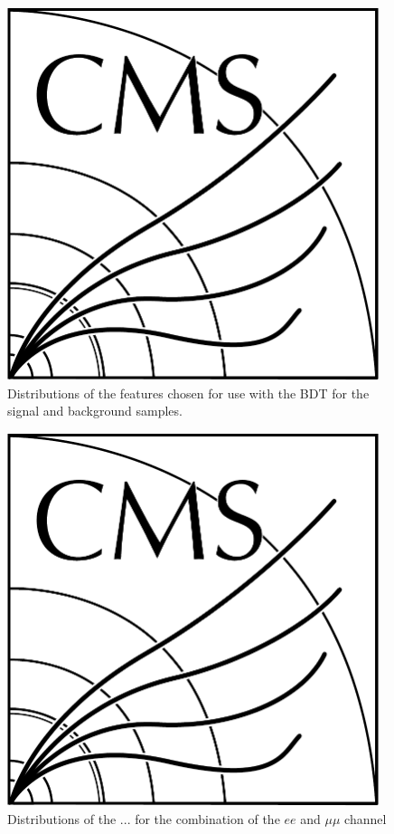 \begin{figure}[tbp]
\centering
\includegraphics[width=0.97\textwidth]{CMS-bw-logo.pdf}
\caption{
Distributions of the features chosen for use with the BDT for the signal and background samples.}
\label{fig:inputFeaturesDistributions}
\end{figure}

\begin{figure}[tbp]
\centering
\includegraphics[width=0.97\textwidth]{CMS-bw-logo.pdf}
\caption{
Distributions of the ... for the combination of the $ee$ and $\mu\mu$ channel}
\label{fig:inputFeaturesDataSimAgreement}
\end{figure}

